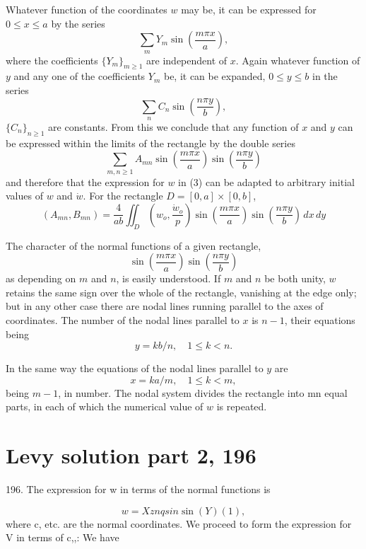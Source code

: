 Whatever function of the coordinates \(w\) may be, it
can be expressed for \(0 \leq x \leq a\) by the series
\[\sum_m Y_m \sin \left(\frac{m \pi x}{a}\right),\]
where the coefficients \({\{ Y_m \}}_{m \geq 1}\) are independent of \(x\).
Again whatever function of \(y\) and any one of the coefficients \(Y_m\) be,
it can be expanded, \(0 \leq y \leq b\) in the series
\[ \sum_n C_n \sin \left(\frac{n \pi y}{b}\right),\]
\({\{ C_n \}}_{n \geq 1}\) are constants.
From this we conclude that any function of
\(x\) and \(y\) can be expressed within the limits of the rectangle by the
double series
\[
\sum_{m,n \geq 1} A_{mn}
\sin \left(\frac{m \pi x}{a}\right) \sin \left(\frac{n \pi y}{b}\right)
\]
and therefore that the expression for \(w\) in (3) can be adapted to
arbitrary initial values of \(w\) and \(\dot{w}\).
For the rectangle \(D = [0,a] \times [0,b]\),
\begin{equation}
(A_{mn}, B_{mn}) = \frac{4}{ab} \iint_D \left(w_o, \frac{ \dot{w}_o }{p} \right)
\sin \left(\frac{m \pi x}{a}\right) \sin \left(\frac{n \pi y}{b}\right) \, dx \, dy
\end{equation}

The character of the normal functions of a given rectangle,
\[
\sin \left(\frac{m \pi x}{a}\right) \sin \left(\frac{n \pi y}{b}\right)
\]
as depending on \(m\) and \(n\), is easily understood. If
\(m\) and \(n\) be both unity, \(w\)
retains the same sign over the whole of the rectangle, vanishing at
the edge only; but in any other case there are nodal lines running
parallel to the axes of coordinates. The number of the nodal lines
parallel to \(x\) is \(n-1\), their equations being
\[ y=k b/n,\quad 1 \leq k < n.\]

In the same way the equations of the nodal lines parallel to
\(y\) are
\[ x = k a/m, \quad 1 \leq k < m,\]
being \(m-1\), in number. The nodal system divides the
rectangle into mn equal parts, in each of which the numerical value of
\(w\) is repeated.


\setcounter{equation}{0}
\section{Levy solution part 2, 196}
196. The expression for w in terms of the normal functions is

\[w= Xz nq sin \sin(Y) (1),\]
where c, etc. are the normal coordinates. We proceed to form the
expression for V in terms of c,,: We have


